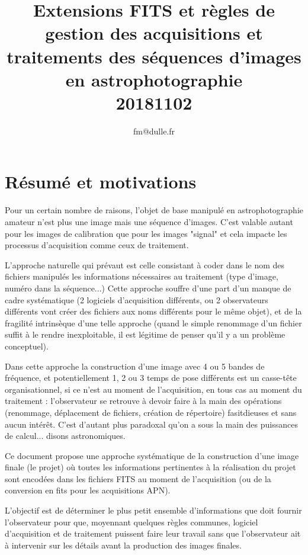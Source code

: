 \documentclass[10pt,a4paper,french]{article}
\title{Extensions FITS et règles de gestion des acquisitions et traitements des séquences d'images en astrophotographie\\ 20181102}
\author{fm@dulle.fr}
\begin{document}
\maketitle
\parindent=0cm
\parskip=0.3cm
\section*{Résumé et motivations}

Pour un certain nombre de raisons, l'objet de base manipulé en astrophotographie amateur 
n'est plus une image mais une séquence d'images. C'est valable autant pour les images de
calibration que pour les images "signal" et cela impacte les processus d'acquisition 
comme ceux de traitement.

L'approche naturelle qui prévaut est celle consistant à coder dans le nom des fichiers
manipulés les informations nécessaires au traitement (type d'image, numéro dans la séquence...)
Cette approche souffre d'une part d'un manque de cadre systématique (2 logiciels d'acquisition
différents, ou 2 observateurs différents vont créer des fichiers aux noms différents pour
le même objet), et de la fragilité intrinsèque d'une telle approche (quand le simple renommage 
d'un fichier suffit à le rendre inexploitable, il est légitime de penser qu'il y a un 
problème conceptuel).

Dans cette approche la construction d'une image avec 4 ou 5 bandes de fréquence, et potentiellement
1, 2 ou 3 temps de pose différents est un casse-tête organisationnel, si ce n'est au moment 
de l'acquisition, en tous cas au moment du traitement : l'observateur se retrouve à devoir 
faire à la main des opérations (renommage, déplacement de fichiers, création de répertoire)
fasitdieuses et sans aucun intérêt. C'est d'autant plus paradoxal qu'on a sous la main 
des puissances de calcul... disons astronomiques.

Ce document propose une approche systématique de la construction d'une image finale (le projet) 
où toutes les informations pertinentes à la réalisation du projet sont encodées dans les 
fichiers FITS au moment de l'acquisition (ou de la conversion en fits pour les acquisitions APN).

L'objectif est de déterminer le plus petit ensemble d'informations que doit fournir
l'observateur pour que, moyennant quelques règles communes, logiciel d'acquisition et de traitement
puissent faire leur travail sans que l'observateur ait à intervenir sur les détails 
avant la production des images finales.
\end{document}
